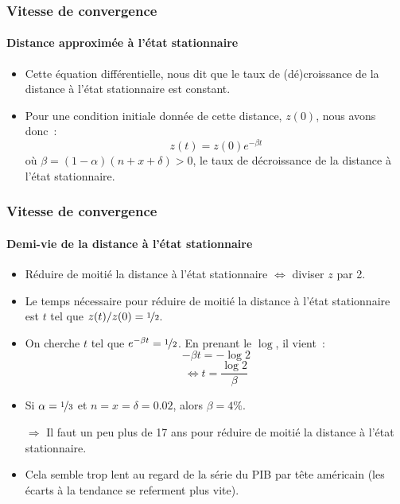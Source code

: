 \documentclass[10pt,notheorems]{beamer}
\theoremstyle{plain}
\theoremstyle{definition} %
\begin{document}
\begin{frame}
  \frametitle{Vitesse de convergence}
  \framesubtitle{Distance approximée à l'état stationnaire}

  \begin{itemize}

  \item Cette équation différentielle, nous dit que le taux de (dé)croissance de la distance à l'état stationnaire est constant.\newline

  \item Pour une condition initiale donnée de cette distance, $z(0)$, nous avons donc~:
    \[
      z(t) = z(0) e^{-\beta t}
    \]
    où $\beta=(1-\alpha)(n+x+\delta)>0$, le taux de décroissance de la distance à l'état stationnaire.
  \end{itemize}

\end{frame}


\begin{frame}
  \frametitle{Vitesse de convergence}
  \framesubtitle{Demi-vie de la distance à l'état stationnaire}

  \bigskip

  \begin{itemize}

  \item Réduire de moitié la distance à l'état stationnaire $\Leftrightarrow$ diviser $z$ par 2.\newline

  \item Le temps nécessaire pour réduire de moitié la distance à l'état stationnaire est $t$ tel que $z(t)/z(0)=\nicefrac{1}{2}$.\newline

  \item On cherche $t$ tel que $e^{-\beta t}=\nicefrac{1}{2}$. En prenant le $\log$, il vient~:
    \[
      - \beta t = -\log 2
    \]
    \[
      \Leftrightarrow t = \frac{\log 2}{\beta}
    \]

  \item Si $\alpha=\nicefrac{1}{3}$ et $n=x=\delta=0.02$, alors $\beta = 4\%$.\newline

  \item[$\Rightarrow$] Il faut un peu plus de 17 ans pour réduire de moitié la distance à l'état stationnaire.\newline

  \item Cela semble trop lent au regard de la série du PIB par tête américain (les écarts à la tendance se referment plus vite).\newline
  \end{itemize}

\end{frame}
\end{document}
